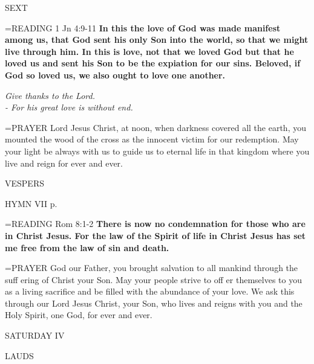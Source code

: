 \begin{flushleft}\normalsize SEXT\\\end{flushleft}

\hangindent=\parindent \small{READING} 1 Jn 4:9-11 \textbf{In this the love of God was made manifest among us, that God sent his only Son into the world, so that we might live through him. In this is love, not that we loved God but that he loved us and sent his Son to be the expiation for our sins. Beloved, if God so loved us, we also ought to love one another.}

\begin{center}
\textit{Give thanks to the Lord.\\
- For his great love is without end.}
\end{center}

\hangindent=\parindent \small{PRAYER  Lord Jesus Christ, at noon, when darkness covered all the earth, you mounted the wood of the cross as the innocent victim for our redemption. May your light be always with us to guide us to eternal life in that kingdom where you live and reign for ever and ever.}

\begin{flushleft}\normalsize VESPERS\\\end{flushleft}

HYMN VII p. \pageref{ordinaryTime:lastHymn}

\hangindent=\parindent \small{READING} Rom 8:1-2 \textbf{There is now no condemnation for those who are in Christ Jesus. For the law of the Spirit of life in Christ Jesus has set me free from the law of sin and death.  \\}

\hangindent=\parindent \small{PRAYER  God our Father, you brought salvation to all mankind through the suff ering of Christ your Son. May your people strive to off er themselves to you as a living sacrifice and be filled with the abundance of your love. We ask this through our Lord Jesus Christ, your Son, who lives and reigns with you and the Holy Spirit, one God, for ever and ever.}

\begin{center}
\normalsize SATURDAY IV
\end{center}

\begin{flushleft}\normalsize LAUDS\\\end{flushleft}

